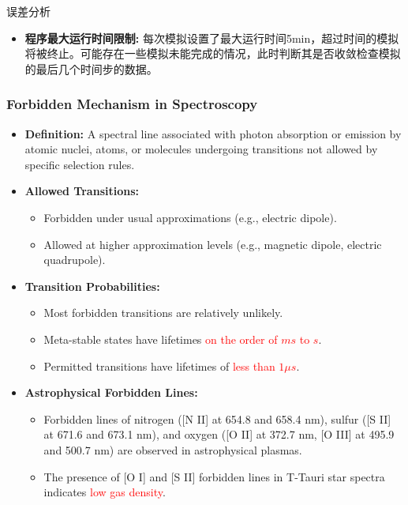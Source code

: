 \documentclass{beamer}		%
\begin{document}
\begin{frame}{误差分析}
    \begin{itemize}
        \item \textbf{程序最大运行时间限制:} 每次模拟设置了最大运行时间5min，超过时间的模拟将被终止。可能存在一些模拟未能完成的情况，此时判断其是否收敛检查模拟的最后几个时间步的数据。
        
    \end{itemize}

\end{frame}
\begin{frame}
    \frametitle{Forbidden Mechanism in Spectroscopy}

    \begin{itemize}
        \item \textbf{Definition:} A spectral line associated with photon absorption or emission by atomic nuclei, atoms, or molecules undergoing transitions not allowed by specific selection rules.
        
        \item \textbf{Allowed Transitions:}
            \begin{itemize}
                \item Forbidden under usual approximations (e.g., electric dipole).
                \item Allowed at higher approximation levels (e.g., magnetic dipole, electric quadrupole).
            \end{itemize}
        
        \item \textbf{Transition Probabilities:}
            \begin{itemize}
                \item Most forbidden transitions are relatively unlikely.
                \item Meta-stable states have lifetimes \textcolor{red}{on the order of $ms$ to $s$}.
                \item Permitted transitions have lifetimes of \textcolor{red}{less than $1\mu s$}.
            \end{itemize}
        
        \item \textbf{Astrophysical Forbidden Lines:}
            \begin{itemize}
                \item Forbidden lines of nitrogen ([N II] at 654.8 and 658.4 nm), sulfur ([S II] at 671.6 and 673.1 nm), and oxygen ([O II] at 372.7 nm, [O III] at 495.9 and 500.7 nm) are observed in astrophysical plasmas.
                \item The presence of [O I] and [S II] forbidden lines in T-Tauri star spectra indicates \textcolor{red}{low gas density}.
            \end{itemize}
    \end{itemize}
\end{frame}
    
\end{document}
